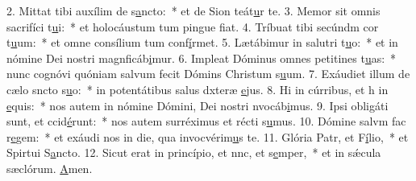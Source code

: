2. Mittat tibi auxílim de s\uline{a}ncto:~* et de Sion teát\uline{u}r te.
3. Memor sit omnis sacrifíci t\uline{u}i:~* et holocáustum tum pingue f\uline{i}at.
4. Tríbuat tibi secúndm cor t\uline{u}um:~* et omne consílium tum conf\uline{í}rmet.
5. Lætábimur in salutri t\uline{u}o:~* et in nómine Dei nostri magnficáb\uline{i}mur.
6. Impleat Dóminus omnes petitines t\uline{u}as:~* nunc cognóvi quóniam salvum fecit Dómins Christum s\uline{u}um.
7. Exáudiet illum de cælo sncto s\uline{u}o:~* in potentátibus salus dxteræ \uline{e}jus.
8. Hi in cúrribus, et h in \uline{e}quis:~* nos autem in nómine Dómini, Dei nostri nvocáb\uline{i}mus.
9. Ipsi obligáti sunt, et ccid\uline{é}runt:~* nos autem surréximus et récti s\uline{u}mus.
10. Dómine salvm fac r\uline{e}gem:~* et exáudi nos in die, qua invocvérim\uline{u}s te.
11. Glória Patr, et F\uline{í}lio,~* et Spirtui S\uline{a}ncto.
12. Sicut erat in princípio, et nnc, et s\uline{e}mper,~* et in sǽcula sæclórum. \uline{A}men.

